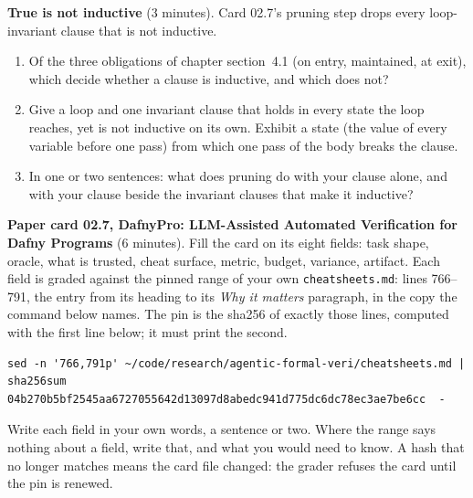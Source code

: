 \documentclass[11pt]{article}
\begin{document}
\begin{problem}[concept]\label{prob:B2}
\textbf{True is not inductive} (3 minutes). Card 02.7's pruning step drops every
loop-invariant clause that is not inductive.
\begin{enumerate}
\item[(a)] Of the three obligations of chapter section~4.1 (on entry, maintained,
  at exit), which decide whether a clause is inductive, and which does not?
\item[(b)] Give a loop and one invariant clause that holds in every state the
  loop reaches, yet is not inductive on its own. Exhibit a state (the value of
  every variable before one pass) from which one pass of the body breaks the
  clause.
\item[(c)] In one or two sentences: what does pruning do with your clause
  alone, and with your clause beside the invariant clauses that make it
  inductive?
\end{enumerate}
\end{problem}

\begin{problem}\label{prob:B3}
\textbf{Paper card 02.7, DafnyPro: LLM-Assisted Automated Verification for
Dafny Programs} (6 minutes). Fill the card on its eight fields: task shape,
oracle, what is trusted, cheat surface, metric, budget, variance, artifact.
Each field is graded against the pinned range of your own
\texttt{cheatsheets.md}: lines 766--791, the entry from its heading to its
\emph{Why it matters} paragraph, in the copy the command below names. The pin
is the sha256 of exactly those lines, computed with the first line below; it
must print the second.
{\small
\begin{verbatim}
sed -n '766,791p' ~/code/research/agentic-formal-veri/cheatsheets.md | sha256sum
04b270b5bf2545aa6727055642d13097d8abedc941d775dc6dc78ec3ae7be6cc  -
\end{verbatim}
}
Write each field in your own words, a sentence or two. Where the range says
nothing about a field, write that, and what you would need to know. A hash
that no longer matches means the card file changed: the grader refuses the
card until the pin is renewed.
\end{problem}
\end{document}
